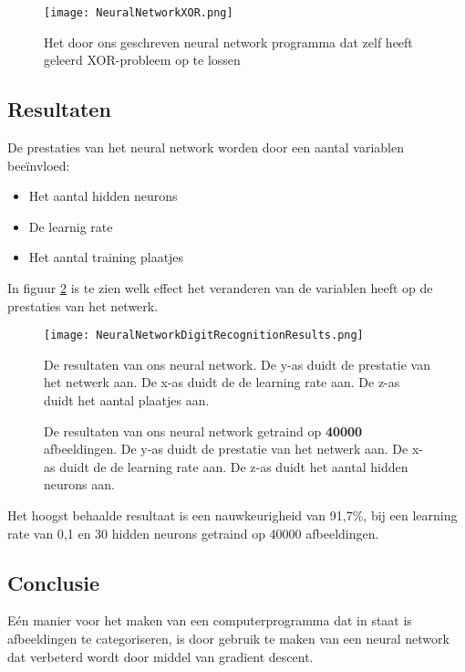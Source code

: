 \begin{figure}[H]
  \centering
    \texttt{[image: NeuralNetworkXOR.png]}
  \caption{Het door ons geschreven neural network programma dat zelf heeft geleerd XOR-probleem op te lossen}
  \label{fig:NNXOR}
\end{figure}

\subsection{Resultaten}
De prestaties van het neural network worden door een aantal variablen bee\"invloed:

\begin{itemize}
  \item Het aantal hidden neurons
  \item De learnig rate
  \item Het aantal training plaatjes
\end{itemize}

In figuur \ref{fig:NNXOR} is te zien welk effect het veranderen van de variablen heeft op de prestaties van het netwerk.

\begin{figure}[H]
  \centering
    \texttt{[image: NeuralNetworkDigitRecognitionResults.png]}
  \caption{De resultaten van ons neural network.
  De y-as duidt de prestatie van het netwerk aan.
  De x-as duidt de de learning rate aan.
  De z-as duidt het aantal plaatjes aan.}
  \label{fig:NNXOR}
\end{figure}

\begin{figure}[H]
\caption{De resultaten van ons neural network getraind op \textbf{40000} afbeeldingen. 
De y-as duidt de prestatie van het netwerk aan. 
De x-as duidt de de learning rate aan. 
De z-as duidt het aantal hidden neurons aan.}
\end{figure}

Het hoogst behaalde resultaat is een nauwkeurigheid van 91,7\%, bij een learning rate van 0,1 en 30 hidden neurons getraind op 40000 afbeeldingen.

\subsection{Conclusie}
E\'en manier voor het maken van een computerprogramma dat in staat is afbeeldingen te categoriseren, is door gebruik te maken van een neural network dat verbeterd wordt door middel van gradient descent.
